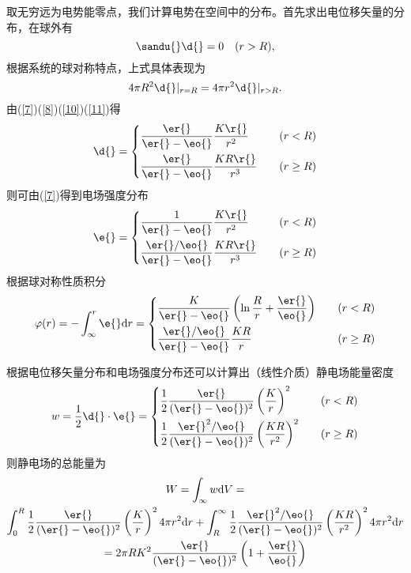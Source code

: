     取无穷远为电势能零点，我们计算电势在空间中的分布。首先求出电位移矢量的分布，在球外有
    \begin{equation}
        \sandu{}\d{}=0 \quad(r>R),\label{10}
    \end{equation}
    根据系统的球对称特点，上式具体表现为
    \begin{equation}
        4\pi R^2\d{}|_{r=R} = 4\pi r^2\d{}|_{r>R}.\label{11}
    \end{equation}
    由(\ref{7})(\ref{8})(\ref{10})(\ref{11})得
    \begin{equation}
        \d{}=
        \left\{
        \begin{aligned}
        	&\frac{\er{}}{\er{}-\eo{}}\frac{K\r{}}{r^2} &\quad (r<R) \\
        	&\frac{\er{}}{\er{}-\eo{}}\frac{KR\r{}}{r^3} &\quad (r\ge R) 
    	\end{aligned}
        \right.
    \end{equation}
    则可由(\ref{7})得到电场强度分布
    \begin{equation}
        \e{}=
        \left\{
        \begin{aligned}
        	&\frac{1}{\er{}-\eo{}}\frac{K\r{}}{r^2} &\quad (r<R) \\
        	&\frac{\er{}/\eo{}}{\er{}-\eo{}}\frac{KR\r{}}{r^3} &\quad (r\ge R) 
    	\end{aligned}
        \right.
    \end{equation}
    根据球对称性质积分
    \begin{equation}
        \varphi(r) = -\int_{\infty}^r\e{}\mathrm{d}r = 
        \left\{
        \begin{aligned}
        	&\frac{K}{\er{}-\eo{}}\left(\ln \frac{R}{r}+\frac{\er{}}{\eo{}}\right) &\quad (r<R) \\
        	&\frac{\er{}/\eo{}}{\er{}-\eo{}}\frac{KR}{r} &\quad (r\ge R) 
    	\end{aligned}
        \right.
    \end{equation}

    根据电位移矢量分布和电场强度分布还可以计算出（线性介质）静电场能量密度
    \begin{equation}
        w = \frac{1}{2}\d{}\cdot\e{}=
        \left\{
        \begin{aligned}
        	&\frac{1}{2}\frac{\er{}}{(\er{}-\eo{})^2}\left(\frac{K}{r}\right)^2 &\quad (r<R) \\
        	&\frac{1}{2}\frac{\er{}^2/\eo{}}{(\er{}-\eo{})^2}\left(\frac{KR}{r^2}\right)^2 &\quad (r\ge R) 
    	\end{aligned}
        \right.
    \end{equation}
    则静电场的总能量为
    \begin{multline}
        W=\int_\infty w\mathrm{d}V=\\
        \int_0^R\frac{1}{2}\frac{\er{}}{(\er{}-\eo{})^2}\left(\frac{K}{r}\right)^2 4\pi r^2\mathrm{d}r 
        + \int_R^\infty \frac{1}{2}\frac{\er{}^2/\eo{}}{(\er{}-\eo{})^2}\left(\frac{KR}{r^2}\right)^2 4\pi r^2\mathrm{d}r\\
        = 2\pi R K^2\frac{\er{}}{(\er{}-\eo{})^2}\left(1+\frac{\er{}}{\eo{}}\right)
    \end{multline}
    
